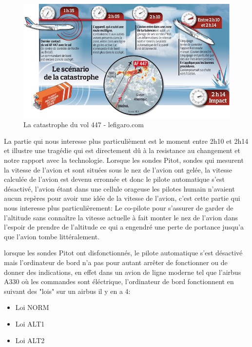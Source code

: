         \begin{figure}[H]
            \centering
            \includegraphics[width=1\textwidth]{Images/447}
            \caption{La catastrophe du vol 447 - lefigaro.com}
            \label{fig:447airfrance}
        \end{figure}

        La partie qui nous interesse plus particulièment est le moment entre 2h10 et 2h14 et illustre 
        une tragédie qui est directement dû à la resistance au changement et notre rapport avec la 
        technologie. \newline 
        Lorsque les sondes Pitot, sondes qui mesurent la vitesse de l'avion et sont situées sous
        le nez de l'avion ont gelée, la vitesse calculée de l'avion est devenu erronnée
        et donc le pilote automatique s'est désactivé, l'avion étant dans une cellule orageuse 
        les pilotes humain n'avaient aucun repères pour avoir une idée de la vitesse de l'avion,
        c'est cette partie qui nous interesse plus particulièrement: 
        Le co-pilote pour s'assurer de garder de l'altitude sans connaître la vitesse actuelle 
        à fait monter le nez de l'avion dans l'espoir de prendre de l'altitude ce qui a engendré 
        une perte de portance jusqu'a que l'avion tombe littéralement. 
        \newline 

        lorsque les sondes Pitot ont disfonctionnés, le pilote automatique s'est désactivé 
        mais l'ordinateur de bord n'a pas pour autant arrêter de fonctionner ou de donner 
        des indications, en effet dans un avion de ligne moderne tel que l'airbus A330
        où les commandes sont éléctrique, l'ordinateur de bord fonctionnent en suivant 
        des "lois" sur un airbus il y en a 4: 
        
        \begin{itemize}
            \item Loi NORM
            \item Loi ALT1
            \item Loi ALT2 
        \end{itemize}

